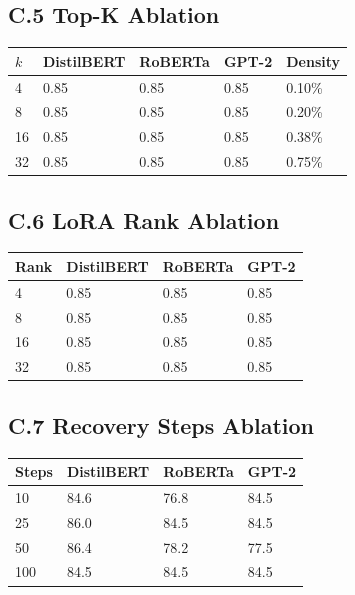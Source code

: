 \subsection{C.5 Top-K Ablation}

\begin{table}[H]
\centering
\small
\begin{tabular}{lllll}
\toprule
\textbf{$k$} & \textbf{DistilBERT} & \textbf{RoBERTa} & \textbf{GPT-2} & \textbf{Density} \\
\midrule
4 & 0.85 & 0.85 & 0.85 & 0.10\% \\
8 & 0.85 & 0.85 & 0.85 & 0.20\% \\
16 & 0.85 & 0.85 & 0.85 & 0.38\% \\
32 & 0.85 & 0.85 & 0.85 & 0.75\% \\
\bottomrule
\end{tabular}
\end{table}

\subsection{C.6 LoRA Rank Ablation}

\begin{table}[H]
\centering
\small
\begin{tabular}{llll}
\toprule
\textbf{Rank} & \textbf{DistilBERT} & \textbf{RoBERTa} & \textbf{GPT-2} \\
\midrule
4 & 0.85 & 0.85 & 0.85 \\
8 & 0.85 & 0.85 & 0.85 \\
16 & 0.85 & 0.85 & 0.85 \\
32 & 0.85 & 0.85 & 0.85 \\
\bottomrule
\end{tabular}
\end{table}

\subsection{C.7 Recovery Steps Ablation}

\begin{table}[H]
\centering
\small
\begin{tabular}{llll}
\toprule
\textbf{Steps} & \textbf{DistilBERT} & \textbf{RoBERTa} & \textbf{GPT-2} \\
\midrule
10 & 84.6 & 76.8 & 84.5 \\
25 & 86.0 & 84.5 & 84.5 \\
50 & 86.4 & 78.2 & 77.5 \\
100 & 84.5 & 84.5 & 84.5 \\
\bottomrule
\end{tabular}
\end{table}

